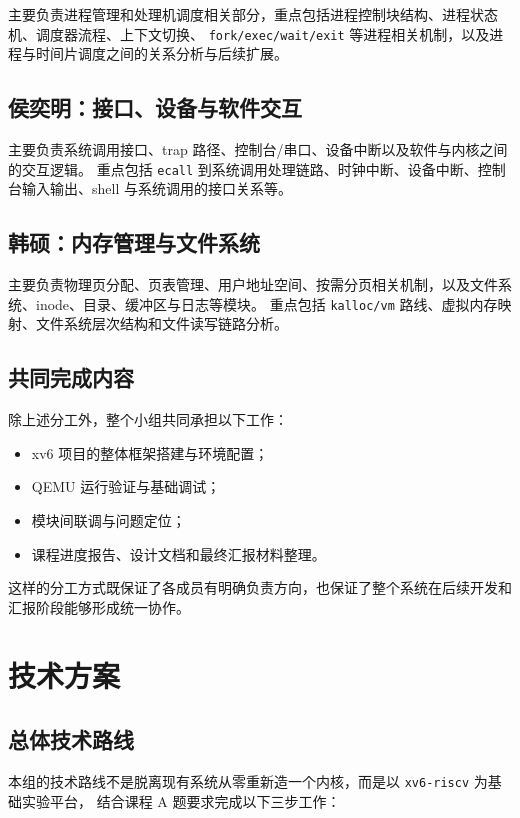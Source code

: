 \documentclass[12pt,a4paper]{ctexart}
\begin{document}
主要负责进程管理和处理机调度相关部分，重点包括进程控制块结构、进程状态机、调度器流程、上下文切换、
\texttt{fork/exec/wait/exit} 等进程相关机制，以及进程与时间片调度之间的关系分析与后续扩展。

\subsection{侯奕明：接口、设备与软件交互}

主要负责系统调用接口、trap 路径、控制台/串口、设备中断以及软件与内核之间的交互逻辑。
重点包括 \texttt{ecall} 到系统调用处理链路、时钟中断、设备中断、控制台输入输出、shell 与系统调用的接口关系等。

\subsection{韩硕：内存管理与文件系统}

主要负责物理页分配、页表管理、用户地址空间、按需分页相关机制，以及文件系统、inode、目录、缓冲区与日志等模块。
重点包括 \texttt{kalloc/vm} 路线、虚拟内存映射、文件系统层次结构和文件读写链路分析。

\subsection{共同完成内容}

除上述分工外，整个小组共同承担以下工作：

\begin{itemize}
  \item xv6 项目的整体框架搭建与环境配置；
  \item QEMU 运行验证与基础调试；
  \item 模块间联调与问题定位；
  \item 课程进度报告、设计文档和最终汇报材料整理。
\end{itemize}

这样的分工方式既保证了各成员有明确负责方向，也保证了整个系统在后续开发和汇报阶段能够形成统一协作。

\section{技术方案}

\subsection{总体技术路线}

本组的技术路线不是脱离现有系统从零重新造一个内核，而是以 \texttt{xv6-riscv} 为基础实验平台，
结合课程 A 题要求完成以下三步工作：
\end{document}
